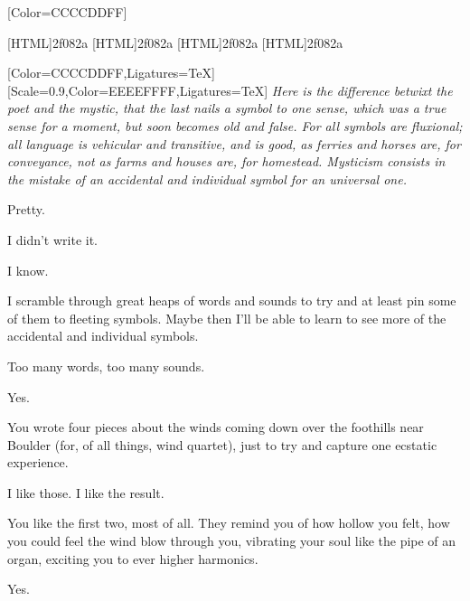 \label{poet-and-mystic}
\renewfontfamily{}[Color=CCCCDDFF]

[HTML]{2f082a}
[HTML]{2f082a}
[HTML]{2f082a}
[HTML]{2f082a}



\begin{paracol}{2}
\begin{rightcolumn*}
  
\end{rightcolumn*}
\begin{leftcolumn}
  [Color=CCCCDDFF,Ligatures=TeX]
  \renewfontfamily{}[Scale=0.9,Color=EEEEFFFF,Ligatures=TeX]
\noindent \emph{Here is the difference betwixt the poet and the mystic, that the last nails a symbol to one sense, which was a true sense for a moment, but soon becomes old and false. For all symbols are fluxional; all language is vehicular and transitive, and is good, as ferries and horses are, for conveyance, not as farms and houses are, for homestead. Mysticism consists in the mistake of an accidental and individual symbol for an universal one.}

\begin{ally}
Pretty.
\end{ally}
I didn't write it.

\begin{ally}
I know.
\end{ally}
I scramble through great heaps of words and sounds to try and at least pin some of them to fleeting symbols. Maybe then I'll be able to learn to see more of the accidental and individual symbols.

\begin{ally}
Too many words, too many sounds.
\end{ally}
Yes.

\begin{ally}
You wrote four pieces about the winds coming down over the foothills near Boulder (for, of all things, wind quartet), just to try and capture one ecstatic experience.
\end{ally}
I like those. I like the result.

\begin{ally}
You like the first two, most of all. They remind you of how hollow you felt, how you could feel the wind blow through you, vibrating your soul like the pipe of an organ, exciting you to ever higher harmonics.
\end{ally}
Yes.


\end{leftcolumn}
\end{paracol}

